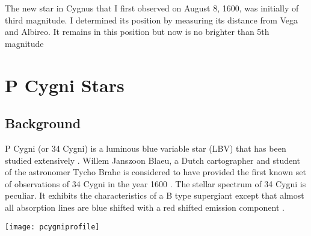 \begin{savequote}[45mm]
The new star in Cygnus that I first observed on August 8, 1600, was initially of third magnitude. I determined its position by measuring its distance from Vega and Albireo. It remains in this position but now is no brighter than 5th magnitude
\end{savequote}

\chapter{P Cygni Stars}

\section{Background}

P Cygni (or 34 Cygni) is a luminous blue variable star (LBV) that has been studied extensively \cite{1953PDAO....9....1B, hutchings1969expanding, elliott20225, underhill1966supergiants}. Willem Janszoon Blaeu, a Dutch cartographer and student of the astronomer Tycho Brahe is considered to have provided the first known set of observations of 34 Cygni in the year 1600 \cite{deGrootPCygni}. The stellar spectrum of 34 Cygni is peculiar. It exhibits the characteristics of a B type supergiant except that almost all absorption lines are blue shifted with a red shifted emission component \cite{hutchings1969expanding}. 

\texttt{[image: pcygniprofile]}
